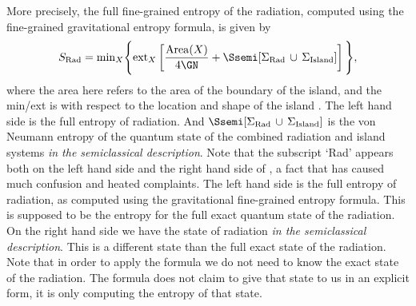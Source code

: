    More precisely,  the full  fine-grained entropy of the radiation, computed using the  fine-grained gravitational entropy formula, is given by 
\begin{align}
S_\mathrm{Rad} = \mathrm{min}_X \Bigg\{ \mathrm{ext}_X\left[ {\mathrm{Area}(X) \over 4 \GN} + \Ssemi [\Sigma_{\rm Rad} \,  \cup \,  \Sigma_{\rm Island}] \right] \Bigg\}, \label{island}
\end{align}
where the area here refers to the area of the boundary of the island, and the min/ext is with respect to the location and shape of the island \cite{Almheiri:2019hni,Penington:2019kki,Almheiri:2019qdq} . 
The left hand side is the full entropy of radiation.  
 And $\Ssemi [\Sigma_{\rm Rad} \,  \cup \,  \Sigma_{\rm Island}]    $ is the von Neumann entropy of the quantum state of the combined radiation and island systems {\it in the semiclassical description}. 
Note that the subscript `Rad' appears both on the left hand side and the right hand side of , a fact that has caused much confusion and heated complaints. The left hand side is the full entropy of radiation, as computed using the gravitational  fine-grained entropy formula. This is supposed to be the entropy for the full exact quantum state of the radiation.  On the right hand side we have the state of radiation {\it in the semiclassical description}. This is a different state than the full exact state of the radiation. Note that in order to apply the formula we do not need to know the exact state of the radiation. The formula does not claim to give that state  to us in an explicit form, it is only computing the entropy of that state.  
  


